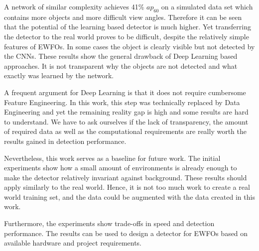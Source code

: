 A network of similar complexity achieves 41\% $ap_{60}$ on a simulated data set which contains more objects and more difficult view angles. Therefore it can be seen that the potential of the learning based detector is much higher. Yet transferring the detector to the real world proves to be difficult, despite the relatively simple features of \acp{EWFO}. In some cases the object is clearly visible but not detected by the \acp{CNN}. These results show the general drawback of Deep Learning based approaches. It is not transparent why the objects are not detected and what exactly was learned by the network.

A frequent argument for Deep Learning is that it does not require cumbersome Feature Engineering. In this work, this step was technically replaced by Data Engineering and yet the remaining reality gap is high and some results are hard to understand. We have to ask ourselves if the lack of transparency, the amount of required data as well as the computational requirements are really worth the results gained in detection performance. 

Nevertheless, this work serves as a baseline for future work. The initial experiments show how a small amount of environments is already enough to make the detector relatively invariant against background. These results should apply similarly to the real world. Hence, it is not too much work to create a real world training set, and the data could be augmented with the data created in this work.

Furthermore, the experiments show trade-offs in speed and detection performance. The results can be used to design a detector for \acp{EWFO} based on available hardware and project requirements.




